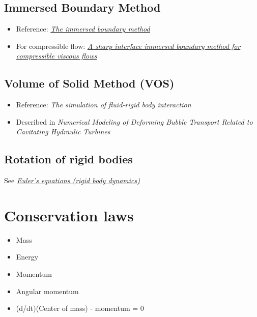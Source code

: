 \documentclass[]{report}
\begin{document}
\section{Immersed Boundary Method}

\begin{itemize}
    \item Reference: \textit{\href{http://www4.ncsu.edu/~zhilin/TEACHING/MA798Z/Peskin1.pdf}{The immersed boundary method}}
    \item For compressible flow: \textit{\href{http://www.cecs.wright.edu/~haibo.dong/wp-content/themes/publications/IBM_JCP_2007.pdf}{A sharp interface immersed boundary method for compressible viscous flows}}
\end{itemize}

\section{Volume of Solid Method (VOS)}

\begin{itemize}
    \item Reference: \textit{The simulation of fluid-rigid body interaction}
    \item Described in \textit{Numerical Modeling of Deforming Bubble Transport Related to Cavitating Hydraulic Turbines}
\end{itemize}

\section{Rotation of rigid bodies}

See \textit{\href{http://en.wikipedia.org/wiki/Euler\%27s_equations_\%28rigid_body_dynamics\%29}{Euler's equations (rigid body dynamics)}}

\chapter{Conservation laws}

\begin{itemize}
    \item Mass
    \item Energy
    \item Momentum
    \item Angular momentum
    \item (d/dt)(Center of mass) - momentum = 0
\end{itemize}

\end{document}

